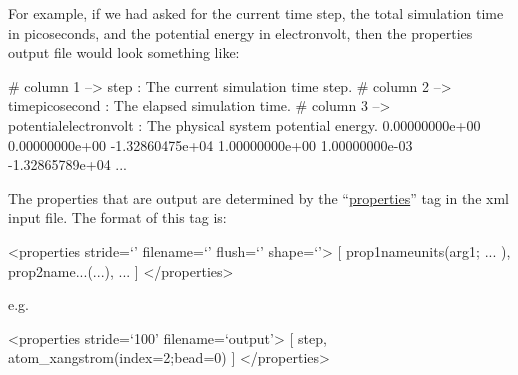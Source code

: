 \documentclass[11pt,english,fleqn]{report}
\newenvironment{code}{%
\footnotesize 
\verbatim
}{
\endverbatim
\normalsize
}
\begin{document}
For example, if we had asked for the current time step, the total
simulation time in picoseconds, and the potential energy in electronvolt,
then the properties output file would look something like:

\begin{code}
# column   1     --> step : The current simulation time step.
# column   2     --> time{picosecond} : The elapsed simulation time.
# column   3     --> potential{electronvolt} : The physical system potential energy.
    0.00000000e+00     0.00000000e+00    -1.32860475e+04
    1.00000000e+00     1.00000000e-03    -1.32865789e+04
...
\end{code}

The properties that are output are determined by the 
{}``\hyperref[PROPERTIES]{properties}''
tag in the xml input file. The format of this tag is:

\begin{code}
<properties stride=`' filename=`' flush=`' shape=`'>
   [ prop1name{units}(arg1; ... ), prop2name{...}(...), ...  ]
</properties>
\end{code}

\noindent e.g.

\begin{code}
<properties stride=`100' filename=`output'>
   [ step, atom_x{angstrom}(index=2;bead=0) ]
</properties>
\end{code}
\end{document}
